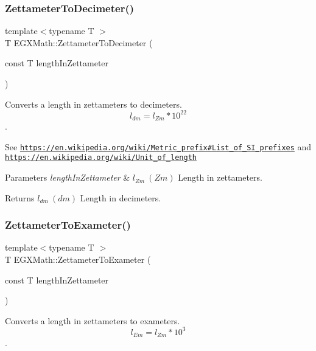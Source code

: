 \subsubsection{\texorpdfstring{Zettameter\+To\+Decimeter()}{ZettameterToDecimeter()}}
{\footnotesize\ttfamily template$<$typename T $>$ \\
T E\+G\+X\+Math\+::\+Zettameter\+To\+Decimeter (\begin{DoxyParamCaption}\item[{const T}]{length\+In\+Zettameter }\end{DoxyParamCaption})}



Converts a length in zettameters to decimeters. \[ l_{dm}=l_{Zm} * 10^{22} \]. 

See \href{https://en.wikipedia.org/wiki/Metric_prefix#List_of_SI_prefixes}{\tt https\+://en.\+wikipedia.\+org/wiki/\+Metric\+\_\+prefix\#\+List\+\_\+of\+\_\+\+S\+I\+\_\+prefixes} and \href{https://en.wikipedia.org/wiki/Unit_of_length}{\tt https\+://en.\+wikipedia.\+org/wiki/\+Unit\+\_\+of\+\_\+length} 
\begin{DoxyParams}{Parameters}
{\em length\+In\+Zettameter} & $ l_{Zm}\ (Zm)$ Length in zettameters. \\
\hline
\end{DoxyParams}
\begin{DoxyReturn}{Returns}
$ l_{dm}\ (dm)$ Length in decimeters. 
\end{DoxyReturn}
\mbox{\label{group___e_g_x_math-_conversions-_length_conversions-_zettameter-_s_i_ga7d9638e3c012b4ff3ad3dc0e0f0393b2}} 
\subsubsection{\texorpdfstring{Zettameter\+To\+Exameter()}{ZettameterToExameter()}}
{\footnotesize\ttfamily template$<$typename T $>$ \\
T E\+G\+X\+Math\+::\+Zettameter\+To\+Exameter (\begin{DoxyParamCaption}\item[{const T}]{length\+In\+Zettameter }\end{DoxyParamCaption})}



Converts a length in zettameters to exameters. \[ l_{Em}=l_{Zm} * 10^{3} \]. 

